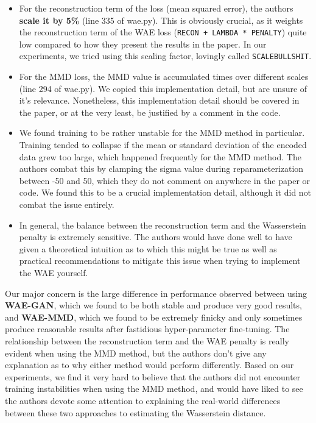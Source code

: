 \documentclass[12pt,english]{amsart}
\begin{document}
\begin{itemize}

      \item{For the reconstruction term of the loss (mean squared error), the
            authors \textbf{scale it by 5\%} (line 335 of wae.py). This is
            obviously crucial, as it weights the reconstruction term of the WAE
            loss (\verb|RECON + LAMBDA * PENALTY|) quite low compared to how they
            present the results in the paper. In our experiments, we tried using
            this scaling factor, lovingly called \verb|SCALEBULLSHIT|.}

      \item{For the MMD loss, the MMD value is accumulated times over different
            scales (line 294 of wae.py). We copied this implementation detail, but
            are unsure of it's relevance. Nonetheless, this implementation detail
            should be covered in the paper, or at the very least, be justified by
            a comment in the code.}

      \item{We found training to be rather unstable for the MMD method in
            particular. Training tended to collapse if the mean or standard
            deviation of the encoded data grew too large, which happened
            frequently for the MMD method. The authors combat this by clamping the
            sigma value during reparameterization between -50 and 50, which they
            do not comment on anywhere in the paper or code. We found this to be a
            crucial implementation detail, although it did not combat the issue
            entirely.}

      \item{In general, the balance between the reconstruction term and the
            Wasserstein penalty is extremely sensitive. The authors would have done
            well to have given a theoretical intuition as to which this might be true
            as well as practical recommendations to mitigate this issue when trying
            to implement the WAE yourself.}

\end{itemize}

Our major concern is the large difference in performance observed between using
\textbf{WAE-GAN}, which we found to be both stable and produce very good results,
and \textbf{WAE-MMD}, which we found to be extremely finicky and only sometimes
produce reasonable results after fastidious hyper-parameter fine-tuning. The
relationship between the reconstruction term and the WAE penalty is really evident
when using the MMD method, but the authors don't give any explanation as to why
either method would perform differently. Based on our experiments, we find it
very hard to believe that the authors did not encounter training instabilities
when using the MMD method, and would have liked to see the authors devote some
attention to explaining the real-world differences between these two approaches
to estimating the Wasserstein distance.



\end{document}
